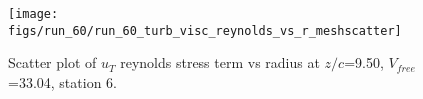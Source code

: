 \begin{figure}[H]
\centering
\texttt{[image: figs/run\_60/run\_60\_turb\_visc\_reynolds\_vs\_r\_meshscatter]}
\caption{Scatter plot of $
u_T$ reynolds stress term vs radius at $z/c$=9.50, $V_{free}$=33.04, station 6.}
\label{fig:run_60_turb_visc_reynolds_vs_r_meshscatter}
\end{figure}



